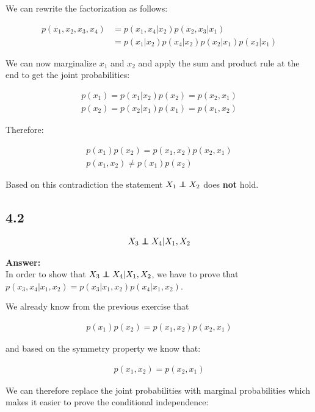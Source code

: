 \documentclass[a4paper]{article}
\newcommand\independent{\protect\mathpalette{\protect\independenT}{\perp}}
\def\independenT#1#2{\mathrel{\rlap{$#1#2$}\mkern2mu{#1#2}}}
\begin{document}
We can rewrite the factorization as follows:

\begin{align*}
	p(x_1,x_2,x_3,x_4) &= p(x_1,x_4|x_2)p(x_2,x_3|x_1)\\
	&= p(x_1|x_2)p(x_4|x_2)p(x_2|x_1)p(x_3|x_1)
\end{align*}

We can now marginalize $x_1$ and $x_2$ and apply the sum and product rule at the end to get the joint probabilities:

\begin{align*}
	p(x_1) = p(x_1|x_2)p(x_2) = p(x_2, x_1)\\
	p(x_2) = p(x_2|x_1)p(x_1) = p(x_1, x_2)
\end{align*}

Therefore:

\begin{align*}
	p(x_1)p(x_2) = p(x_1,x_2)p(x_2,x_1)\\
	p(x_1, x_2) \neq p(x_1)p(x_2)
\end{align*}

Based on this contradiction the statement $X_1 \independent X_2$ does \textbf{not} hold.

\subsection*{4.2}

\begin{align*}
	X_3 \independent X_4 | X_1,X_2
\end{align*}

\textbf{Answer:}\\

In order to show that $X_3 \independent X_4 | X_1,X_2$, we have to prove that $p(x_3, x_4 | x_1, x_2) = p(x_3 | x_1, x_2)p(x_4 | x_1, x_2)$. 

We already know from the previous exercise that 

\begin{align*}
	p(x_1)p(x_2) = p(x_1,x_2)p(x_2,x_1)
\end{align*}

and based on the symmetry property we know that:

\begin{align*}
	p(x_1,x_2) = p(x_2,x_1)
\end{align*}

We can therefore replace the joint probabilities with marginal probabilities which makes it easier to prove the conditional independence:
\end{document}
